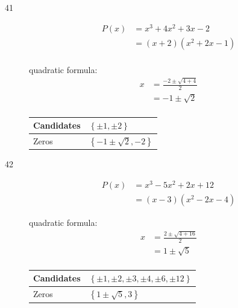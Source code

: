 \documentclass{exam}
\begin{document}
\begin{description}
      \item[41] 
        \begin{align*}
          P(x) &= x^3 + 4x^2 + 3x - 2  \\
               &= (x + 2)(x^2 + 2x - 1) \\
        \end{align*}

        quadratic formula:
        \begin{align*}
          x &= \frac{-2 \pm \sqrt{4 + 4}}{2} \\
            &= -1 \pm \sqrt{2} \\
        \end{align*}

        \begin{tabular}{ll}
          \toprule
          Candidates & $\left\{ \pm 1, \pm 2 \right\}$ \\
          \midrule
          Zeros      & $\left\{ -1 \pm \sqrt{2}, -2 \right\}$ \\
          \bottomrule
        \end{tabular}

        \vspace{.5 cm}

      \item[42] 
        \begin{align*}
          P(x) &= x^3 - 5x^2 + 2x + 12 \\
               &= (x - 3)(x^2 - 2x - 4)
        \end{align*}
        
        quadratic formula:
        \begin{align*}
          x &= \frac{2 \pm \sqrt{4 + 16}}{2} \\
            &= 1 \pm \sqrt{5} \\
        \end{align*}

        \begin{tabular}{ll}
          \toprule
          Candidates & $\left\{ \pm 1, \pm 2, \pm 3, \pm 4, \pm 6, \pm 12 \right\}$ \\
          \midrule
          Zeros      & $\left\{ 1 \pm \sqrt{5}, 3 \right\}$ \\
          \bottomrule
        \end{tabular}

        \vspace{.5 cm}

    \pagebreak


\end{description}
\end{document}
